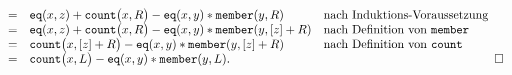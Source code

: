 \begin{enumerate}
\[\begin{array}[b]{cll}
       = & \mathtt{eq}(x,z) + \mathtt{count}\bigl(x, R \bigr) - \mathtt{eq}(x,y) * \mathtt{member}(y,R)&
           \mbox{nach Induktions-Voraussetzung}\\
       = & \mathtt{eq}(x,z) + \mathtt{count}\bigl(x, R \bigr) - \mathtt{eq}(x,y) * \mathtt{member}(y,[z]+R) &
           \mbox{nach Definition von \texttt{member}}\\
       = & \mathtt{count}\bigl(x, [z] + R \bigr) - \mathtt{eq}(x,y) * \mathtt{member}(y,[z]+R) &
           \mbox{nach Definition von \texttt{count}}\\
       = & \mathtt{count}\bigl(x, L \bigr) - \mathtt{eq}(x,y) * \mathtt{member}(y,L). 
      \end{array}\hspace*{\fill} \Box
      \]
\end{enumerate}

